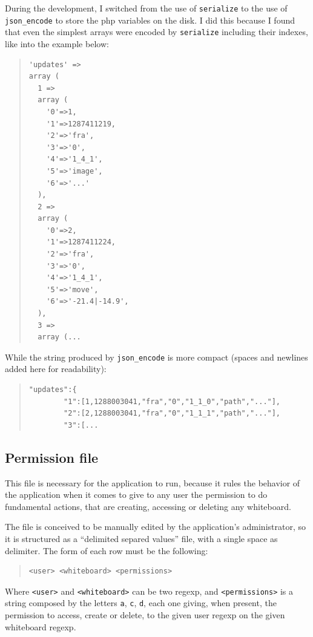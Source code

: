 \documentclass[10pt,a4paper,english]{book}
\begin{document}
During the development, I switched from the use of \texttt{serialize} to
the use of \texttt{json{\_}encode} to store the php variables on the disk. I
did this because I found that even the simplest arrays were encoded by
\texttt{serialize} including their indexes, like into the example below:
\begin{quote}\begin{verbatim}
'updates' =>
array (
  1 =>
  array (
    '0'=>1,
    '1'=>1287411219,
    '2'=>'fra',
    '3'=>'0',
    '4'=>'1_4_1',
    '5'=>'image',
    '6'=>'...'
  ),
  2 =>
  array (
    '0'=>2,
    '1'=>1287411224,
    '2'=>'fra',
    '3'=>'0',
    '4'=>'1_4_1',
    '5'=>'move',
    '6'=>'-21.4|-14.9',
  ),
  3 =>
  array (...
\end{verbatim}
\end{quote}

While the string produced by \texttt{json{\_}encode} is more compact (spaces
and newlines added here for readability):
\begin{quote}\begin{verbatim}
"updates":{
        "1":[1,1288003041,"fra","0","1_1_0","path","..."],
        "2":[2,1288003041,"fra","0","1_1_1","path","..."],
        "3":[...
\end{verbatim}
\end{quote}



\hypertarget{permission-file}{}
\subsection{Permission file}
\label{permission-file}

This file is necessary for the application to run, because it rules
the behavior of the application when it comes to give to any user the
permission to do fundamental actions, that are creating, accessing or
deleting any whiteboard.

The file is conceived to be manually edited by the application's
administrator, so it is structured as a ``delimited separed values''
file, with a single space as delimiter. The form of each row must be
the following:
\begin{quote}\begin{verbatim}
<user> <whiteboard> <permissions>
\end{verbatim}
\end{quote}

Where \texttt{<user>} and \texttt{<whiteboard>} can be two regexp, and
\texttt{<permissions>} is a string composed by the letters \texttt{a}, \texttt{c},
\texttt{d}, each one giving, when present, the permission to access, create
or delete, to the given user regexp on the given whiteboard regexp.
\end{document}
